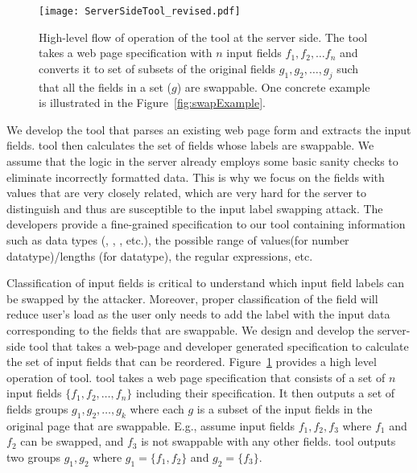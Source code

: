 \begin{figure}[t]
 \centering
 \texttt{[image: ServerSideTool\_revised.pdf]}
 \caption{High-level flow of operation of the \name tool at the server side. The tool takes a web page specification with $n$ input fields $f_1, f_2,\ldots f_n$ and converts it to set of subsets of the original fields $g_1, g_2, \ldots, g_j$ such that all the fields in a set ($g$) are swappable. One concrete example is illustrated in the Figure~\ref{fig:swapExample}.}
 \label{fig:tool}
\end{figure}

We develop the \tool tool that parses an existing web page form and extracts the input fields. \tool tool then calculates the set of fields whose labels are swappable. We assume that the logic in the server already employs some basic sanity checks to eliminate incorrectly formatted data. This is why we focus on the fields with values that are very closely related, which are very hard for the server to distinguish and thus are susceptible to the input label swapping attack. The developers provide a fine-grained specification to our tool containing information such as data types (\integer, \String, \Boolean, etc.), the possible range of values(for number datatype)/lengths (for \String datatype), the regular expressions, etc.

 Classification of input fields is critical to understand which input field labels can be swapped by the attacker. Moreover, proper classification of the field will reduce user's load as the user only needs to add the label with the input data corresponding to the fields that are swappable. We design and develop the server-side \tool tool that takes a web-page and developer generated specification to calculate the set of input fields that can be reordered. Figure~\ref{fig:tool} provides a high level operation of \tool tool. \tool tool takes a web page specification that consists of a set of $n$ input fields $\{f_1, f_2, \ldots, f_n\}$ including their specification. It then outputs a set of fields groups $g_1, g_2,\ldots,g_k$ where each $g$ is a subset of the input fields in the original page that are swappable. E.g., assume input fields $f_1, f_2, f_3$ where $f_1$ and $f_2$ can be swapped, and $f_3$ is not swappable with any other fields. \tool tool outputs two groups $g_1, g_2$ where $g_1=\{f_1, f_2\}$ and $g_2=\{f_3\}$.


